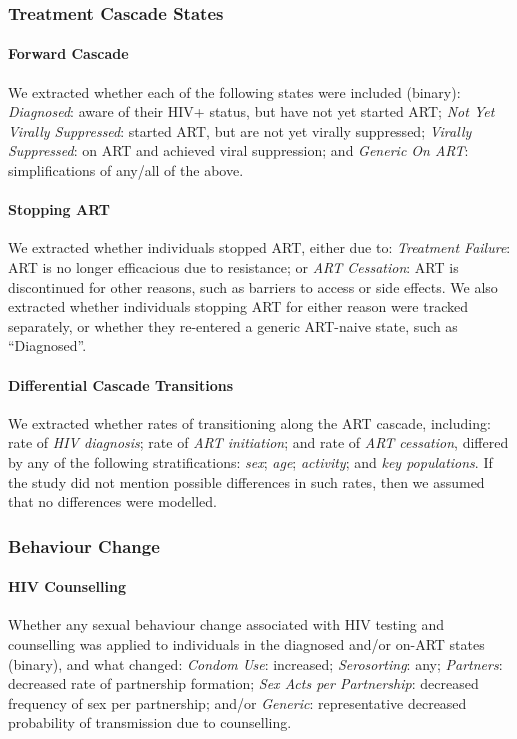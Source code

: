 \subsubsection{Treatment Cascade States}
\label{aaa:defs:cascade}
\paragraph{Forward Cascade}
We extracted whether each of the following states were included (binary):
\emph{Diagnosed}: aware of their HIV+ status, but have not yet started ART;
\emph{Not Yet Virally Suppressed}: started ART, but are not yet virally suppressed;
\emph{Virally Suppressed}: on ART and achieved viral suppression; and
\emph{Generic On ART}: simplifications of any/all of the above.
\paragraph{Stopping ART}
We extracted whether individuals stopped ART, either due to:
\emph{Treatment Failure}: ART is no longer efficacious due to resistance; or
\emph{ART Cessation}: ART is discontinued for other reasons,
such as barriers to access or side effects.
We also extracted whether individuals stopping ART for either reason
were tracked separately, or whether they re-entered a generic ART-naive state,
such as ``Diagnosed''.
\paragraph{Differential Cascade Transitions}
We extracted whether rates of transitioning along the ART cascade, including:
rate of \emph{HIV diagnosis}; rate of \emph{ART initiation}; and rate of \emph{ART cessation},
differed by any of the following stratifications:
\emph{sex}; \emph{age}; \emph{activity}; and \emph{key populations}.
If the study did not mention possible differences in such rates,
then we assumed that no differences were modelled.
\subsubsection{Behaviour Change}
\label{aaa:defs:bc}
\paragraph{HIV Counselling}
Whether any sexual behaviour change associated with HIV testing and counselling
was applied to individuals in the diagnosed and/or on-ART states (binary),
and what changed:
\emph{Condom Use}: increased;
\emph{Serosorting}: any;
\emph{Partners}: decreased rate of partnership formation;
\emph{Sex Acts per Partnership}: decreased frequency of sex per partnership; and/or
\emph{Generic}: representative decreased probability of transmission due to counselling.

